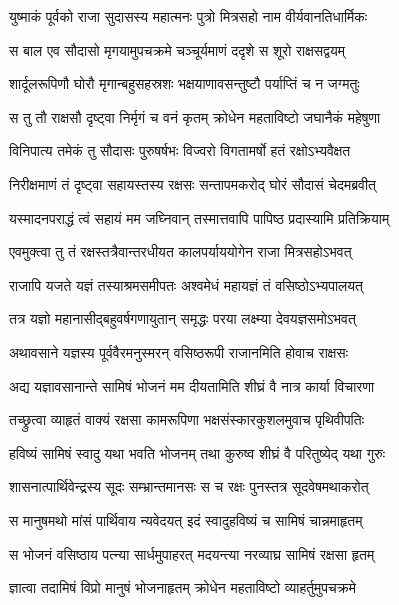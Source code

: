 \twolineshloka
{युष्माकं पूर्वको राजा सुदासस्य महात्मनः}
{पुत्रो मित्रसहो नाम वीर्यवानतिधार्मिकः} %

\twolineshloka
{स बाल एव सौदासो मृगयामुपचक्रमे}
{चञ्चूर्यमाणं ददृशे स शूरो राक्षसद्वयम्} %

\twolineshloka
{शार्दूलरूपिणौ घोरौ मृगान्बहुसहस्रशः}
{भक्षयाणावसन्तुष्टौ पर्याप्तिं च न जग्मतुः} %

\twolineshloka
{स तु तौ राक्षसौ दृष्ट्वा निर्मृगं च वनं कृतम्}
{क्रोधेन महताविष्टो जघानैकं महेषुणा} %

\twolineshloka
{विनिपात्य तमेकं तु सौदासः पुरुषर्षभः}
{विज्वरो विगतामर्षो हतं रक्षोऽभ्यवैक्षत} %

\twolineshloka
{निरीक्षमाणं तं दृष्ट्वा सहायस्तस्य रक्षसः}
{सन्तापमकरोद् घोरं सौदासं चेदमब्रवीत्} %

\twolineshloka
{यस्मादनपराद्धं त्वं सहायं मम जघ्निवान्}
{तस्मात्तवापि पापिष्ठ प्रदास्यामि प्रतिक्रियाम्} %

\twolineshloka
{एवमुक्त्वा तु तं रक्षस्तत्रैवान्तरधीयत}
{कालपर्याययोगेन राजा मित्रसहोऽभवत्} %

\twolineshloka
{राजापि यजते यज्ञं तस्याश्रमसमीपतः}
{अश्वमेधं महायज्ञं तं वसिष्ठोऽभ्यपालयत्} %

\twolineshloka
{तत्र यज्ञो महानासीद्बहुवर्षगणायुतान्}
{समृद्धः परया लक्ष्म्या देवयज्ञसमोऽभवत्} %

\twolineshloka
{अथावसाने यज्ञस्य पूर्ववैरमनुस्मरन्}
{वसिष्ठरूपी राजानमिति होवाच राक्षसः} %

\twolineshloka
{अद्य यज्ञावसानान्ते सामिषं भोजनं मम}
{दीयतामिति शीघ्रं वै नात्र कार्या विचारणा} %

\twolineshloka
{तच्छ्रुत्वा व्याहृतं वाक्यं रक्षसा कामरूपिणा}
{भक्षसंस्कारकुशलमुवाच पृथिवीपतिः} %

\twolineshloka
{हविष्यं सामिषं स्वादु यथा भवति भोजनम्}
{तथा कुरुष्व शीघ्रं वै परितुष्येद् यथा गुरुः} %

\twolineshloka
{शासनात्पार्थिवेन्द्रस्य सूदः सम्भ्रान्तमानसः}
{स च रक्षः पुनस्तत्र सूदवेषमथाकरोत्} %

\twolineshloka
{स मानुषमथो मांसं पार्थिवाय न्यवेदयत्}
{इदं स्वादुहविष्यं च सामिषं चान्नमाहृतम्} %

\twolineshloka
{स भोजनं वसिष्ठाय पत्न्या सार्धमुपाहरत्}
{मदयन्त्या नरव्याघ्र सामिषं रक्षसा हृतम्} %

\twolineshloka
{ज्ञात्वा तदामिषं विप्रो मानुषं भोजनाहृतम्}
{क्रोधेन महताविष्टो व्याहर्तुमुपचक्रमे} %


